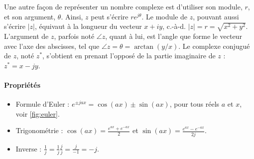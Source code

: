 \documentclass [a4paper, 11pt] {article}
\begin{document}
    Une autre façon de représenter un nombre complexe est d'utiliser son module, $r$, et son argument, $\theta$. Ainsi, $z$ peut s'écrire $r e^{j \theta}$. Le module de $z$, pouvant aussi s'écrire $|z|$, équivaut à la longueur du vecteur $x+iy$, c.-à-d. $|z|=r=\sqrt{x^2 + y^2}$. L'argument de $z$, parfois noté $\angle z$, quant à lui, est l'angle que forme le vecteur avec l'axe des abscisses, tel que $\angle z = \theta = \arctan(y/x)$. Le complexe conjugué de $z$, noté $z^*$, s'obtient en prenant l'opposé de la partie imaginaire de $z$ : $z^*=x - j y$.
    
    \paragraph{Propriétés}
    
    \begin{itemize}
        \item Formule d'Euler : $e^{\pm j a x} = \cos(ax) \pm \sin(a x)$, pour tous réels $a$ et $x$, voir \autoref{fig:euler}.
        \item Trigonométrie : $\cos(a x) = \frac{e^{ a x} + e^{-a x}}{2}$ et $\sin(a x) = \frac{e^{ a x} - e^{-a x}}{2j}$.
        \item Inverse : $\frac{1}{j} = \frac{1}{j} \frac{j}{j} = \frac{j}{-1} = -j$.
    \end{itemize}
    
\end{document}
